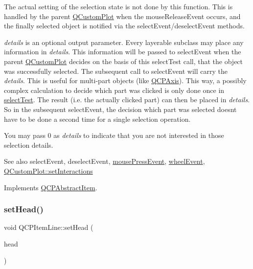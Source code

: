 The actual setting of the selection state is not done by this function. This is handled by the parent \hyperlink{class_q_custom_plot}{Q\+Custom\+Plot} when the mouse\+Release\+Event occurs, and the finally selected object is notified via the select\+Event/deselect\+Event methods.

{\itshape details} is an optional output parameter. Every layerable subclass may place any information in {\itshape details}. This information will be passed to select\+Event when the parent \hyperlink{class_q_custom_plot}{Q\+Custom\+Plot} decides on the basis of this select\+Test call, that the object was successfully selected. The subsequent call to select\+Event will carry the {\itshape details}. This is useful for multi-\/part objects (like \hyperlink{class_q_c_p_axis}{Q\+C\+P\+Axis}). This way, a possibly complex calculation to decide which part was clicked is only done once in \hyperlink{class_q_c_p_item_line_a8e02bfbca04fbcf3dbc375a2bf693229}{select\+Test}. The result (i.\+e. the actually clicked part) can then be placed in {\itshape details}. So in the subsequent select\+Event, the decision which part was selected doesn\textquotesingle{}t have to be done a second time for a single selection operation.

You may pass 0 as {\itshape details} to indicate that you are not interested in those selection details.

\begin{DoxySeeAlso}{See also}
select\+Event, deselect\+Event, \hyperlink{class_q_c_p_layerable_af6567604818db90f4fd52822f8bc8376}{mouse\+Press\+Event}, \hyperlink{class_q_c_p_layerable_a47dfd7b8fd99c08ca54e09c362b6f022}{wheel\+Event}, \hyperlink{class_q_custom_plot_a5ee1e2f6ae27419deca53e75907c27e5}{Q\+Custom\+Plot\+::set\+Interactions} 
\end{DoxySeeAlso}


Implements \hyperlink{class_q_c_p_abstract_item_ae41d0349d68bb802c49104afd100ba2a}{Q\+C\+P\+Abstract\+Item}.

\mbox{\label{class_q_c_p_item_line_aebf3d687114d584e0459db6759e2c3c3}} 
\subsubsection{\texorpdfstring{set\+Head()}{setHead()}}
{\footnotesize\ttfamily void Q\+C\+P\+Item\+Line\+::set\+Head (\begin{DoxyParamCaption}\item[{const \hyperlink{class_q_c_p_line_ending}{Q\+C\+P\+Line\+Ending} \&}]{head }\end{DoxyParamCaption})}

